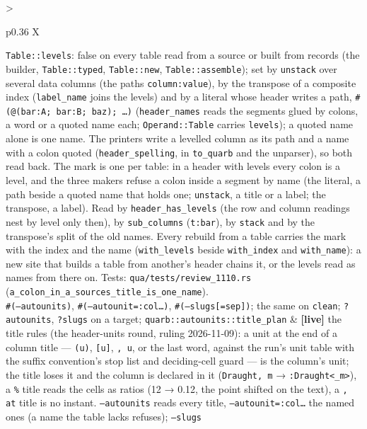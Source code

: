 \documentclass{report}
\newcommand{\live}{\textbf{\textcolor{blue!60!black}{[live]}}\xspace}
\begin{document}
\begin{xltabular}{\textwidth}{>{\raggedright\arraybackslash}p{0.36\textwidth} X}
    \texttt{Table::levels}: false on every table read from a source
    or built from records (the builder, \texttt{Table::typed},
    \texttt{Table::new}, \texttt{Table::assemble}); set by
    \texttt{unstack} over several data columns (the paths
    \texttt{column:value}), by the transpose of a composite index
    (\texttt{label\_name} joins the levels) and by a literal whose
    header writes a path, \texttt{\#(@(bar:A; bar:B; baz); …)}
    (\texttt{header\_names} reads the segments glued by colons, a
    word or a quoted name each; \texttt{Operand::Table} carries
    \texttt{levels}); a quoted name alone is one name. The printers
    write a levelled column as its path and a name with a colon
    quoted (\texttt{header\_spelling}, in \texttt{to\_quarb} and
    the unparser), so both read back. The mark is one per table: in
    a header with levels every colon is a level, and the three
    makers refuse a colon inside a segment by name (the literal, a
    path beside a quoted name that holds one; \texttt{unstack}, a
    title or a label; the transpose, a label). Read by
    \texttt{header\_has\_levels} (the
    row and column readings nest by level only then), by
    \texttt{sub\_columns} (\texttt{t:bar}), by \texttt{stack} and
    by the transpose's split of the old names. Every rebuild from a
    table carries the mark with the index and the name
    (\texttt{with\_levels} beside \texttt{with\_index} and
    \texttt{with\_name}): a new site that builds a table from
    another's header chains it, or the levels read as names from
    there on. Tests: \texttt{qua/tests/review\_1110.rs}
    (\texttt{a\_colon\_in\_a\_sources\_title\_is\_one\_name}). \\
\texttt{\#(--autounits)}, \texttt{\#(--autounit=:col…)}, \texttt{\#(--slugs[=sep])}; the same on \texttt{clean}; \texttt{?autounits}, \texttt{?slugs} on a target; \texttt{quarb::autounits::title\_plan}
  & \live the title rules (the header-units round, ruling
    2026-11-09): a unit at the end of a column title — \texttt{(u)},
    \texttt{[u]}, \texttt{, u}, or the last word, against the run's
    unit table with the suffix convention's stop list and deciding-cell
    guard — is the column's unit; the title loses it and the column
    is declared in it (\texttt{Draught, m} → \texttt{:Draught<\_m>}),
    a \texttt{\%} title reads the cells as ratios (12 → 0.12, the
    point shifted on the text), a \texttt{, at} title is no instant.
    \texttt{--autounits} reads every title, \texttt{--autounit=:col…}
    the named ones (a name the table lacks refuses); \texttt{--slugs}

\end{xltabular}
\end{document}
